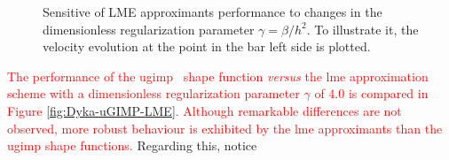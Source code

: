 \documentclass[preprint,12pt,a4paper]{elsarticle}
\newcommand{\PNA}[1]{
  \textcolor{red}{{#1}}
}
\begin{document}
\begin{figure}\sidecaption
  \centering
  \caption{Sensitive of LME approximants performance to changes in the
    dimensionless regularization parameter $\gamma = \beta/h^2$. To
    illustrate it, the velocity evolution at the point in the bar left side
    is plotted.}
  \label{fig:Dyka-LME-gamma}
\end{figure}
\PNA{The performance of the
\acrshort{ugimp}~\cite{Bardenhagen2004} shape function \textit{versus} the \acrshort{lme} approximation scheme with
a dimensionless regularization parameter $\gamma$ of 4.0 is compared in Figure \ref{fig:Dyka-uGIMP-LME}. Although remarkable differences are not observed, more
robust behaviour is exhibited by the \acrshort{lme} approximants than the \acrshort{ugimp} shape functions.} Regarding this, notice
\end{document}
